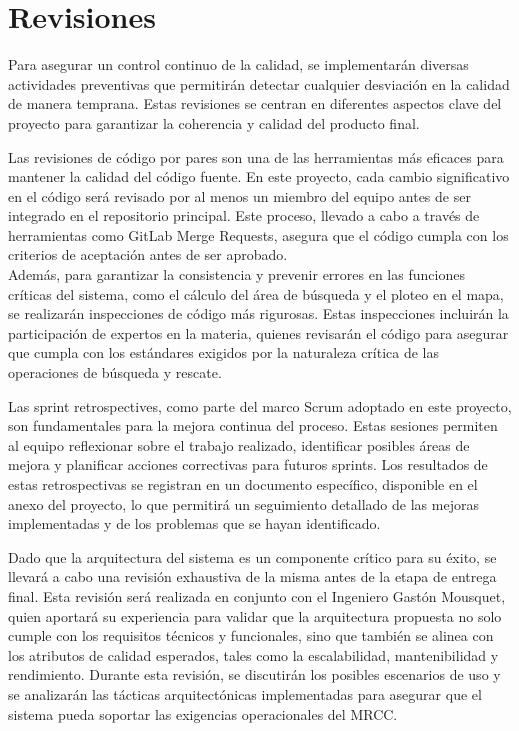 \section{Revisiones}\label{sec:revisiones}

Para asegurar un control continuo de la calidad, se implementarán diversas actividades preventivas que permitirán detectar 
cualquier desviación en la calidad de manera temprana. Estas revisiones se centran en diferentes aspectos clave del proyecto 
para garantizar la coherencia y calidad del producto final.

Las revisiones de código por pares son una de las herramientas más eficaces para mantener la calidad del código fuente. En este proyecto, 
cada cambio significativo en el código será revisado por al menos un miembro del equipo antes de ser integrado en el repositorio principal. 
Este proceso, llevado a cabo a través de herramientas como GitLab Merge Requests, asegura que el código cumpla con los criterios de aceptación 
antes de ser aprobado.\\
Además, para garantizar la consistencia y prevenir errores en las funciones críticas del sistema, como el cálculo del área de búsqueda y el ploteo 
en el mapa, se realizarán inspecciones de código más rigurosas. Estas inspecciones incluirán la participación de expertos en la materia, quienes 
revisarán el código para asegurar que cumpla con los estándares exigidos por la naturaleza crítica de las operaciones de búsqueda y rescate.

Las sprint retrospectives, como parte del marco Scrum adoptado en este proyecto, son fundamentales para la mejora continua del proceso. Estas sesiones 
permiten al equipo reflexionar sobre el trabajo realizado, identificar posibles áreas de mejora y planificar acciones correctivas para futuros sprints. 
Los resultados de estas retrospectivas se registran en un documento específico, disponible en el anexo del proyecto, lo que permitirá un seguimiento 
detallado de las mejoras implementadas y de los problemas que se hayan identificado.

Dado que la arquitectura del sistema es un componente crítico para su éxito, se llevará a cabo una revisión exhaustiva de la misma antes de la etapa de 
entrega final. Esta revisión será realizada en conjunto con el Ingeniero Gastón Mousquet, quien aportará su experiencia para validar que la arquitectura 
propuesta no solo cumple con los requisitos técnicos y funcionales, sino que también se alinea con los atributos de calidad esperados, tales como la 
escalabilidad, mantenibilidad y rendimiento. Durante esta revisión, se discutirán los posibles escenarios de uso y se analizarán las tácticas arquitectónicas 
implementadas para asegurar que el sistema pueda soportar las exigencias operacionales del MRCC.

